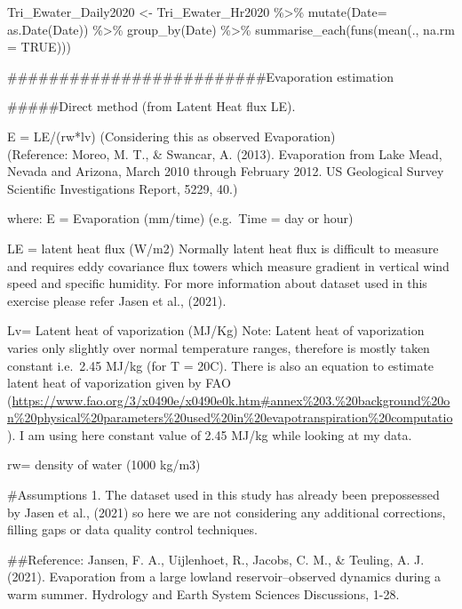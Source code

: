 \documentclass[
]{article}
\newenvironment{Shaded}{\begin{snugshade}}{\end{snugshade}}
\newcommand{\AttributeTok}[1]{\textcolor[rgb]{0.77,0.63,0.00}{#1}}
\newcommand{\ConstantTok}[1]{\textcolor[rgb]{0.00,0.00,0.00}{#1}}
\newcommand{\FunctionTok}[1]{\textcolor[rgb]{0.00,0.00,0.00}{#1}}
\newcommand{\NormalTok}[1]{#1}
\newcommand{\OtherTok}[1]{\textcolor[rgb]{0.56,0.35,0.01}{#1}}
\newcommand{\SpecialCharTok}[1]{\textcolor[rgb]{0.00,0.00,0.00}{#1}}
\begin{document}
\begin{Shaded}
\begin{Highlighting}[]
\NormalTok{Tri\_Ewater\_Daily2020 }\OtherTok{\textless{}{-}}\NormalTok{ Tri\_Ewater\_Hr2020  }\SpecialCharTok{\%\textgreater{}\%} 
  \FunctionTok{mutate}\NormalTok{(}\AttributeTok{Date=} \FunctionTok{as.Date}\NormalTok{(Date)) }\SpecialCharTok{\%\textgreater{}\%} 
  \FunctionTok{group\_by}\NormalTok{(Date) }\SpecialCharTok{\%\textgreater{}\%} 
  \FunctionTok{summarise\_each}\NormalTok{(}\FunctionTok{funs}\NormalTok{(}\FunctionTok{mean}\NormalTok{(., }\AttributeTok{na.rm =} \ConstantTok{TRUE}\NormalTok{)))}
\end{Highlighting}
\end{Shaded}

\#\#\#\#\#\#\#\#\#\#\#\#\#\#\#\#\#\#\#\#\#\#\#\#\#Evaporation estimation

\#\#\#\#\#Direct method (from Latent Heat flux LE).

E = LE/(rw*lv) (Considering this as observed Evaporation)\\
(Reference: Moreo, M. T., \& Swancar, A. (2013). Evaporation from Lake
Mead, Nevada and Arizona, March 2010 through February 2012. US
Geological Survey Scientific Investigations Report, 5229, 40.)

where: E = Evaporation (mm/time) (e.g.~Time = day or hour)

LE = latent heat flux (W/m2) Normally latent heat flux is difficult to
measure and requires eddy covariance flux towers which measure gradient
in vertical wind speed and specific humidity. For more information about
dataset used in this exercise please refer Jasen et al., (2021).

Lv= Latent heat of vaporization (MJ/Kg) Note: Latent heat of
vaporization varies only slightly over normal temperature ranges,
therefore is mostly taken constant i.e.~2.45 MJ/kg (for T = 20C). There
is also an equation to estimate latent heat of vaporization given by FAO
(\url{https://www.fao.org/3/x0490e/x0490e0k.htm\#annex\%203.\%20background\%20on\%20physical\%20parameters\%20used\%20in\%20evapotranspiration\%20computatio}).
I am using here constant value of 2.45 MJ/kg while looking at my data.

rw= density of water (1000 kg/m3)

\#Assumptions 1. The dataset used in this study has already been
prepossessed by Jasen et al., (2021) so here we are not considering any
additional corrections, filling gaps or data quality control techniques.

\#\#Reference: Jansen, F. A., Uijlenhoet, R., Jacobs, C. M., \& Teuling,
A. J. (2021). Evaporation from a large lowland reservoir--observed
dynamics during a warm summer. Hydrology and Earth System Sciences
Discussions, 1-28.
\end{document}
